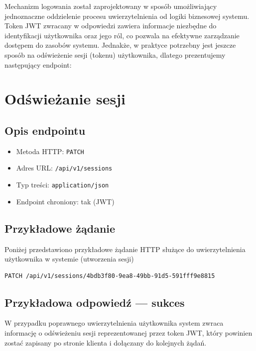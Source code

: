 \documentclass[11pt, a4paper]{article}
\begin{document}
Mechanizm logowania został zaprojektowany w sposób umożliwiający jednoznaczne
oddzielenie procesu uwierzytelnienia od logiki biznesowej systemu. Token JWT
zwracany w odpowiedzi zawiera informacje niezbędne do identyfikacji użytkownika
oraz jego ról, co pozwala na efektywne zarządzanie dostępem do zasobów systemu.
Jednakże, w praktyce potrzebny jest jeszcze sposób na odświeżenie sesji (tokenu) użytkownika, dlatego prezentujemy następujący endpoint:


\section{Odświeżanie sesji}

\subsection{Opis endpointu}

\begin{itemize}
    \item Metoda HTTP: \texttt{PATCH}
    \item Adres URL: \texttt{/api/v1/sessions}
    \item Typ treści: \texttt{application/json}
    \item Endpoint chroniony: tak (JWT)
\end{itemize}

\subsection{Przykładowe żądanie}

Poniżej przedstawiono przykładowe żądanie HTTP służące do uwierzytelnienia
użytkownika w systemie (utworzenia sesji)

\begin{lstlisting}[style=http,caption={Przykładowe żądanie logowania}]
PATCH /api/v1/sessions/4bdb3f80-9ea8-49bb-91d5-591fff9e8815
\end{lstlisting}

\subsection{Przykładowa odpowiedź — sukces}

W przypadku poprawnego uwierzytelnienia użytkownika system zwraca informację o odświeżeniu sesji reprezentowanej przez token JWT,
który powinien zostać zapisany po stronie klienta i dołączany do kolejnych żądań.
\end{document}
